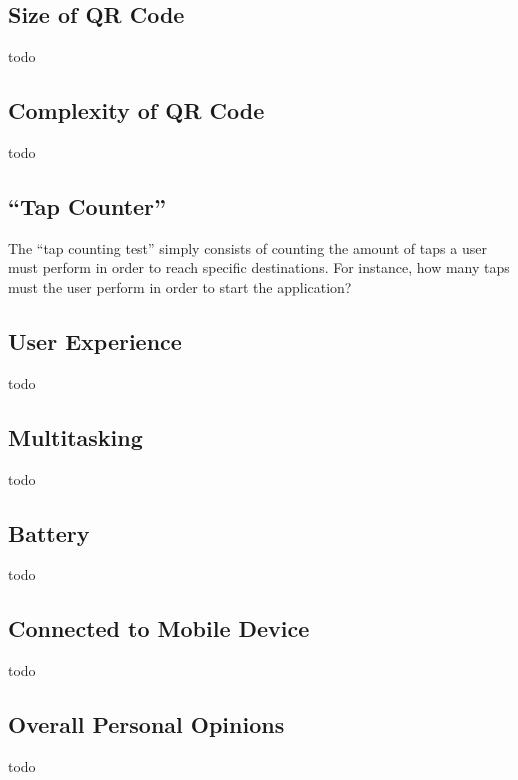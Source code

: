 \subsection{Size of QR Code}
todo

\subsection{Complexity of QR Code}
todo

\subsection{``Tap Counter''}
The ``tap counting test'' simply consists of counting the amount of taps a user must perform in order to reach specific destinations. For instance, how many taps must the user perform in order to start the application?

\subsection{User Experience}
todo

\subsection{Multitasking}
todo

\subsection{Battery}
todo

\subsection{Connected to Mobile Device}
todo

\subsection{Overall Personal Opinions}
todo